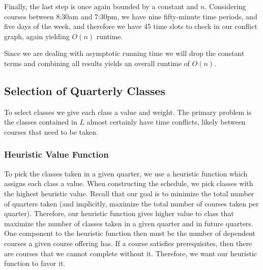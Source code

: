 \documentclass[11pt]{article} %
\begin{document}
Finally, the last step is once again bounded by a constant and $n$.  Considering
courses between 8:30am and 7:30pm, we have nine fifty-minute time periods, and
five days of the week, and therefore we have 45 time slots to check in our
conflict graph, again yielding $O(n)$ runtime.

Since we are dealing with asymptotic running time we will drop the constant
terms and combining all results yields an overall runtime of $O(n)$.

\subsection{Selection of Quarterly Classes} To select classes we give each class
a value and weight.  The primary problem is the classes contained in $L$
almost certainly have time conflicts, likely between courses that need to be
taken.  

\subsubsection{Heuristic Value Function} To pick the classes taken in a given quarter,
we use a heuristic function which assigns
each class a value.  When constructing the schedule, we pick classes with the highest heuristic value.
Recall that our goal is to
minimize the total number of quarters taken (and implicitly, maximize the total
number of courses taken per quarter).  Therefore, our heuristic function gives higher
value to class that maximize the number of classes taken in a given quarter and in
future quarters.  One component to the heuristic function then must be the
number of dependent courses a given course offering has.  If a course satisfies
prerequisites, then there are courses that we cannot
complete without it.  Therefore, we want our heuristic function to favor it.
\end{document}
